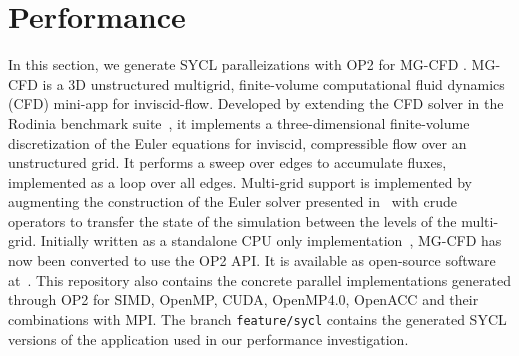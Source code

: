 \documentclass[runningheads]{llncs}
\begin{document}
\section{Performance}\label{sec/perf}\vspace{-5pt}
\noindent In this section, we generate SYCL paralleizations with OP2 for MG-CFD 
\cite{Owenson2019}. MG-CFD is a 3D unstructured multigrid, finite-volume 
computational fluid dynamics (CFD) mini-app for inviscid-flow. Developed by 
extending the CFD solver in the Rodinia benchmark 
suite~\cite{RodiniaCFD2009,rodinia}, it implements a three-dimensional 
finite-volume discretization of the Euler equations for inviscid, compressible 
flow over an unstructured grid. It performs a sweep over edges to accumulate 
fluxes, implemented as a loop over all edges. Multi-grid support is implemented 
by augmenting the construction of the Euler solver presented 
in~\cite{RodiniaCFD2009} with crude operators to transfer the state of the 
simulation between the levels of the multi-grid. Initially written as a 
standalone CPU only implementation~\cite{Owenson2019}, MG-CFD has now been 
converted to use the OP2 API. It is available as open-source software 
at~\cite{mgcfd-op2}. This repository also contains the concrete parallel 
implementations generated through OP2 for SIMD, OpenMP, CUDA, OpenMP4.0, OpenACC 
and their combinations with MPI. The branch \texttt{feature/sycl} contains the 
generated SYCL versions of the application used in our performance 
investigation. 
\end{document}
